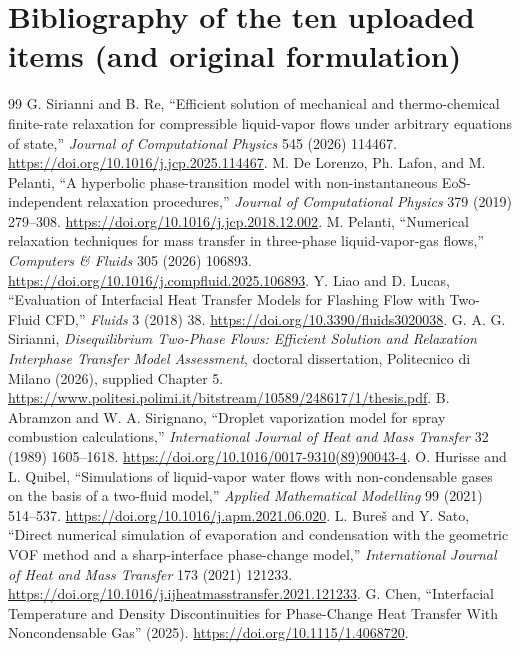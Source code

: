 \documentclass[11pt,letterpaper]{article}
\begin{document}
\section{Bibliography of the ten uploaded items (and original formulation)}
\begin{thebibliography}{99}
 G. Sirianni and B. Re, ``Efficient solution of mechanical and thermo-chemical finite-rate relaxation for compressible liquid-vapor flows under arbitrary equations of state,'' \emph{Journal of Computational Physics} 545 (2026) 114467. \url{https://doi.org/10.1016/j.jcp.2025.114467}.
 M. De Lorenzo, Ph. Lafon, and M. Pelanti, ``A hyperbolic phase-transition model with non-instantaneous EoS-independent relaxation procedures,'' \emph{Journal of Computational Physics} 379 (2019) 279--308. \url{https://doi.org/10.1016/j.jcp.2018.12.002}.
 M. Pelanti, ``Numerical relaxation techniques for mass transfer in three-phase liquid-vapor-gas flows,'' \emph{Computers \& Fluids} 305 (2026) 106893. \url{https://doi.org/10.1016/j.compfluid.2025.106893}.
 Y. Liao and D. Lucas, ``Evaluation of Interfacial Heat Transfer Models for Flashing Flow with Two-Fluid CFD,'' \emph{Fluids} 3 (2018) 38. \url{https://doi.org/10.3390/fluids3020038}.
 G. A. G. Sirianni, \emph{Disequilibrium Two-Phase Flows: Efficient Solution and Relaxation Interphase Transfer Model Assessment}, doctoral dissertation, Politecnico di Milano (2026), supplied Chapter 5. \url{https://www.politesi.polimi.it/bitstream/10589/248617/1/thesis.pdf}.
 B. Abramzon and W. A. Sirignano, ``Droplet vaporization model for spray combustion calculations,'' \emph{International Journal of Heat and Mass Transfer} 32 (1989) 1605--1618. \url{https://doi.org/10.1016/0017-9310(89)90043-4}.
 O. Hurisse and L. Quibel, ``Simulations of liquid-vapor water flows with non-condensable gases on the basis of a two-fluid model,'' \emph{Applied Mathematical Modelling} 99 (2021) 514--537. \url{https://doi.org/10.1016/j.apm.2021.06.020}.
 L. Bure\v{s} and Y. Sato, ``Direct numerical simulation of evaporation and condensation with the geometric VOF method and a sharp-interface phase-change model,'' \emph{International Journal of Heat and Mass Transfer} 173 (2021) 121233. \url{https://doi.org/10.1016/j.ijheatmasstransfer.2021.121233}.
 G. Chen, ``Interfacial Temperature and Density Discontinuities for Phase-Change Heat Transfer With Noncondensable Gas'' (2025). \url{https://doi.org/10.1115/1.4068720}.

\end{thebibliography}
\end{document}
